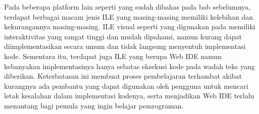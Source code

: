 
Pada beberapa platform lain seperti yang sudah dibahas pada bab sebelumnya, terdapat berbagai macam jenis ILE yang masing-masing memiliki kelebihan dan kekurangannya masing-masing. ILE visual seperti yang digunakan pada \textcite{brilliant2021media} memiliki interaktivitas yang sangat tinggi dan mudah dipahami, namun kurang dapat diimplementasikan secara umum dan tidak langsung menyentuh implementasi kode. Sementara itu, terdapat juga ILE yang berupa Web IDE namun kebanyakan implementasinya hanya sebatas eksekusi kode pada wadah teks yang diberikan. Keterbatasan ini membuat proses pembelajaran terhambat akibat kurangnya ada pembantu yang dapat digunakan oleh pengguna untuk mencari letak kesalahan dalam implementasi kodenya, serta menjadikan Web IDE terlalu menantang bagi pemula yang ingin belajar pemrograman.



